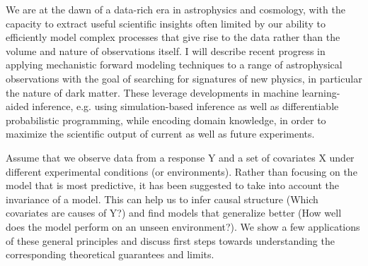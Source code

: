 \documentclass[a4paper,UKenglish]{dagrep-v2018}
\begin{document}
\license

We are at the dawn of a data-rich era in astrophysics and cosmology, with the capacity to extract useful scientific insights often limited by our ability to efficiently model complex processes that give rise to the data rather than the volume and nature of observations itself. I will describe recent progress in applying mechanistic forward modeling techniques to a range of astrophysical observations with the goal of searching for signatures of new physics, in particular the nature of dark matter. These leverage developments in machine learning-aided inference, e.g. using simulation-based inference as well as differentiable probabilistic programming, while encoding domain knowledge, in order to maximize the scientific output of current as well as future experiments.

\license

Assume that we observe data from a response Y and a set of covariates X under different experimental conditions (or environments). Rather than focusing on the model that is most predictive, it has been suggested to take into account the invariance of a model. This can help us to infer causal structure (Which covariates are causes of Y?) and find models that generalize better (How well does the model perform on an unseen environment?). We show a few applications of these general principles and discuss first steps towards understanding the corresponding theoretical guarantees and limits.

\license
\end{document}
